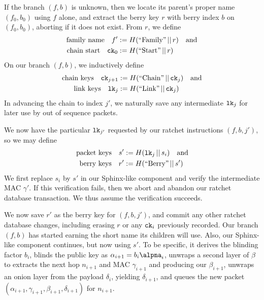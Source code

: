 \documentclass[twoside,letterpaper]{llncs}
\def\mathcomma{,}
\def\mathperiod{.}
\def\mathcomma{}
\def\mathperiod{}
\begin{document}
If the branch $(f,b)$ is unknown, then we locate its parent's
proper name $(f_0,b_0)$ using $f$ alone, and extract the berry
key $r$ with berry index $b$ on $(f_0,b_0)$,
 aborting if it does not exist.
From $r$, we define
\[ \begin{aligned}
\textrm{family name}\quad
 f' &:= H(\textrm{``Family''} \,||\, r) \quad\textrm{and} \\ %
\textrm{chain start}\quad
 \ck_0 &:= H(\textrm{``Start''} \,||\, r) \mathperiod \\
\end{aligned} \]
On our branch $(f,b)$, we inductively define 
\[ \begin{aligned}
\textrm{chain keys}\quad
 \ck_{j+1} &:= H(\textrm{``Chain''} \,||\, \ck_j) \quad\textrm{and} \\ %
\textrm{link keys}\quad
 \lk_j &:= H(\textrm{``Link''} \,||\, \ck_j) \mathperiod \\
\end{aligned} \]
In advancing the chain to index $j'$, we naturally save any 
intermediate $\texttt{lk}_j$ for later use by out of sequence packets.

We now have the particular $\texttt{lk}_{j'}$ requested by our ratchet 
instructions $(f,b,j')$, so we may define 
\[ \begin{aligned}
\textrm{packet keys}\quad 
 s' &:= H(\lk_j \,||\, s_i) \quad\textrm{and} \\ %
\textrm{berry keys}\quad 
 r' &:= H(\textrm{``Berry''} \,||\, s') \mathperiod \\
\end{aligned} \]
We first replace $s_i$ by $s'$ in our Sphinx-like component
and verify the intermediate MAC $\gamma'$.  If this verification
fails, then we abort and abandon our ratchet database transaction.
We thus assume the verification succeeds.  

We now save $r'$ as the berry key for $(f,b,j')$, and commit any
other ratchet database changes, including erasing $r$ or any 
$\texttt{ck}_i$ previously recorded.  Our branch $(f,b)$ has started
earning the short name its children will use.  
Also, our Sphinx-like component continues, but now using $s'$.
To be specific, it derives the blinding factor $b_i$,
blinds the public key as $\alpha_{i+1} = b_i \alpna_i$,
unwraps a second layer of $\beta$ to extracts the
 next hop $n_{i+1}$ and MAC $\gamma_{i+1}$ and 
 producing our $\beta_{i+1}$,
unwraps an onion layer from the payload $\delta_i$,
 yielding $\delta_{i+1}$, and queues the new packet
$(\alpha_{i+1},\gamma_{i+1},\beta_{i+1},\delta_{i+1})$ for $n_{i+1}$.
\end{document}
